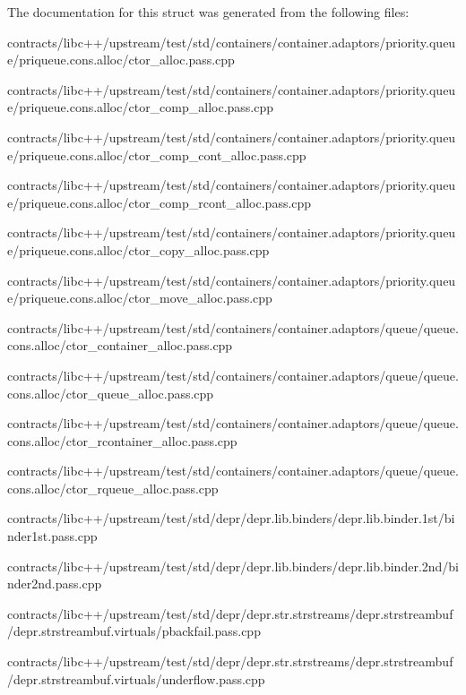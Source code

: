 The documentation for this struct was generated from the following files\+:\begin{DoxyCompactItemize}
\item 
contracts/libc++/upstream/test/std/containers/container.\+adaptors/priority.\+queue/priqueue.\+cons.\+alloc/ctor\+\_\+alloc.\+pass.\+cpp\item 
contracts/libc++/upstream/test/std/containers/container.\+adaptors/priority.\+queue/priqueue.\+cons.\+alloc/ctor\+\_\+comp\+\_\+alloc.\+pass.\+cpp\item 
contracts/libc++/upstream/test/std/containers/container.\+adaptors/priority.\+queue/priqueue.\+cons.\+alloc/ctor\+\_\+comp\+\_\+cont\+\_\+alloc.\+pass.\+cpp\item 
contracts/libc++/upstream/test/std/containers/container.\+adaptors/priority.\+queue/priqueue.\+cons.\+alloc/ctor\+\_\+comp\+\_\+rcont\+\_\+alloc.\+pass.\+cpp\item 
contracts/libc++/upstream/test/std/containers/container.\+adaptors/priority.\+queue/priqueue.\+cons.\+alloc/ctor\+\_\+copy\+\_\+alloc.\+pass.\+cpp\item 
contracts/libc++/upstream/test/std/containers/container.\+adaptors/priority.\+queue/priqueue.\+cons.\+alloc/ctor\+\_\+move\+\_\+alloc.\+pass.\+cpp\item 
contracts/libc++/upstream/test/std/containers/container.\+adaptors/queue/queue.\+cons.\+alloc/ctor\+\_\+container\+\_\+alloc.\+pass.\+cpp\item 
contracts/libc++/upstream/test/std/containers/container.\+adaptors/queue/queue.\+cons.\+alloc/ctor\+\_\+queue\+\_\+alloc.\+pass.\+cpp\item 
contracts/libc++/upstream/test/std/containers/container.\+adaptors/queue/queue.\+cons.\+alloc/ctor\+\_\+rcontainer\+\_\+alloc.\+pass.\+cpp\item 
contracts/libc++/upstream/test/std/containers/container.\+adaptors/queue/queue.\+cons.\+alloc/ctor\+\_\+rqueue\+\_\+alloc.\+pass.\+cpp\item 
contracts/libc++/upstream/test/std/depr/depr.\+lib.\+binders/depr.\+lib.\+binder.\+1st/binder1st.\+pass.\+cpp\item 
contracts/libc++/upstream/test/std/depr/depr.\+lib.\+binders/depr.\+lib.\+binder.\+2nd/binder2nd.\+pass.\+cpp\item 
contracts/libc++/upstream/test/std/depr/depr.\+str.\+strstreams/depr.\+strstreambuf/depr.\+strstreambuf.\+virtuals/pbackfail.\+pass.\+cpp\item 
contracts/libc++/upstream/test/std/depr/depr.\+str.\+strstreams/depr.\+strstreambuf/depr.\+strstreambuf.\+virtuals/underflow.\+pass.\+cpp\item 

\end{DoxyCompactItemize}
